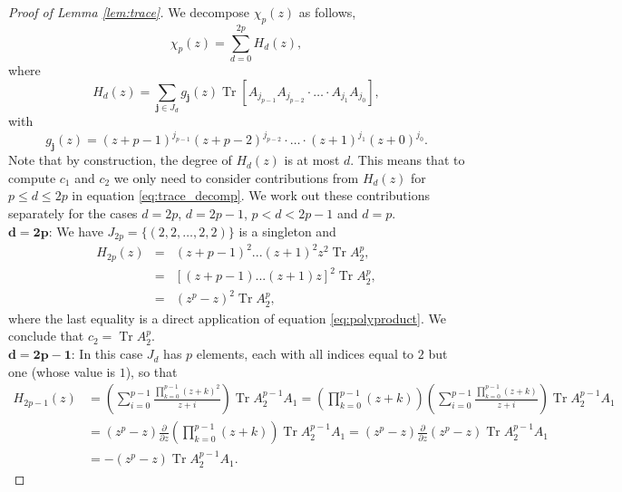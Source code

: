 \documentclass[a4paper,reqno]{amsart}
\numberwithin{equation}{section}
\numberwithin{figure}{section}
\theoremstyle{remark}
\begin{document}
\begin{proof}[Proof of Lemma \ref{lem:trace}]
We  decompose $\chi_p(z)$ as follows,
    \begin{equation}\label{eq:trace_decomp}
       \chi_p(z)=\sum_{d=0}^{2p} H_d(z),
    \end{equation}
where
\begin{equation}\label{eq:H(z) sum}
   H_d(z)=\sum_{\mathbf{j}\in J_d}g_\mathbf{j}(z) \operatorname{Tr}\left[A_{j_{p-1}}A_{j_{p-2}}\cdot\ldots\cdot A_{j_1}A_{j_0}\right],
\end{equation}
with
\begin{equation*}
    g_\mathbf{j}(z)=(z+p-1)^{j_{p-1}}(z+p-2)^{j_{p-2}}\cdot\ldots\cdot (z+1)^{j_1}(z+0)^{j_0}.
\end{equation*}
Note that by construction, the degree of $H_d(z)$ is at most $d$. This means that to compute $c_1$ and $c_2$ we only need to consider contributions from $H_d(z)$ for $p\leq d \leq 2p$ in equation \eqref{eq:trace_decomp}. We work out these contributions separately for the cases $d=2p$, $d=2p-1$, $p<d<2p-1$ and $d=p$.\\
$\mathbf{d=2p}$: We have $J_{2p}=\{(2,2,\ldots,2,2)\}$ is a singleton and
    \begin{eqnarray}
        H_{2p}(z) &=& (z+p-1)^2...(z+1)^2z^2\operatorname{Tr}A_{2}^p,\nonumber\\
        &=& [(z+p-1)...(z+1)z]^2\operatorname{Tr}A_{2}^p,\nonumber\\
        &=& (z^p-z)^2\operatorname{Tr}A_{2}^p,\label{eq:c3}
    \end{eqnarray} 
    where the last equality is a direct application of equation \eqref{eq:polyproduct}. We conclude that $c_2 = \operatorname{Tr}A_{2}^p$.\\
$\mathbf{d=2p-1}$: In this case $J_{d}$ has $p$ elements, each with all indices equal to $2$ but one (whose value is $1$), so that
    \begin{align}
        H_{2p-1}(z) &= \left( \sum_{i=0}^{p-1}\frac{\prod_{k=0}^{p-1} (z+k)^2}{z+i} \right) \operatorname{Tr}A_{2}^{p-1}A_1
        = \left(\prod_{k=0}^{p-1} (z+k)\right) \left( \sum_{i=0}^{p-1}\frac{\prod_{k=0}^{p-1} (z+k)}{z+i} \right) \operatorname{Tr}A_{2}^{p-1}A_1\nonumber\\
        &= (z^p-z)  \frac{\partial}{\partial z} \left( \prod_{k=0}^{p-1} (z+k)\right) \operatorname{Tr}A_{2}^{p-1}A_1=  (z^p-z)  \frac{\partial}{\partial z}(z^p-z) \operatorname{Tr}A_{2}^{p-1}A_1\nonumber\\
        &=  -(z^p-z)\operatorname{Tr}A_{2}^{p-1}A_1. \label{eq:c2(i)}
    \end{align} 

\end{proof}
\end{document}
